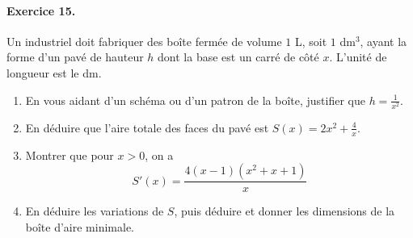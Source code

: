 \documentclass[11pt]{article}
\begin{document}
\paragraph{Exercice 15.}
Un industriel doit fabriquer des boîte fermée de volume $1$ L, soit $1$ dm$^3$,
ayant la forme d'un pavé de hauteur $h$ dont la base est un carré de côté $x$.
L'unité de longueur est le dm.
\begin{enumerate}
  \item En vous aidant d'un schéma ou d'un patron de la boîte, justifier que
    $h=\frac{1}{x^2}$.
  \item En déduire que l'aire totale des faces du pavé est
    $S(x)=2x^2+\frac{4}{x}$.
  \item Montrer que pour $x>0$, on a
    \[
      S'(x) = \frac{4(x-1)(x^2+x+1)}{x}
    \]
  \item En déduire les variations de $S$, puis déduire et donner les dimensions
    de la boîte d'aire minimale.
\end{enumerate}
\end{document}
